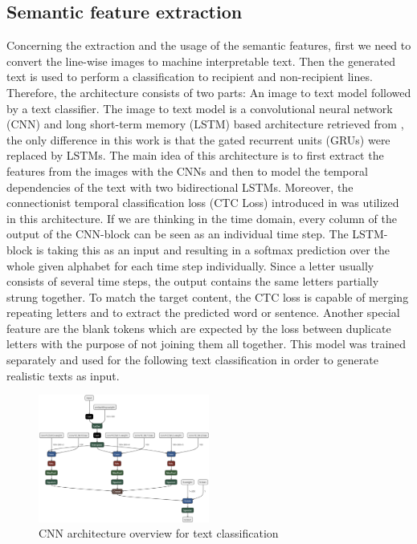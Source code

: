 \documentclass[conference]{IEEEtran}
\begin{document}
\subsection{Semantic feature extraction}\label{sem_feat}
Concerning the extraction and the usage of the semantic features, first we need to convert the line-wise images to machine interpretable text. Then the generated text is used to perform a classification to recipient and non-recipient lines. Therefore, the architecture consists of two parts: An image to text model followed by a text classifier. The image to text model is a convolutional neural network (CNN) and long short-term memory (LSTM) based architecture retrieved from \cite{8169670}, the only difference in this work is that the gated recurrent units (GRUs) were replaced by LSTMs. The main idea of this architecture is to first extract the features from the images with the CNNs and then to model the temporal dependencies of the text with two bidirectional LSTMs. Moreover, the connectionist temporal classification loss (CTC Loss) introduced in \cite{inproceedings} was utilized in this architecture. If we are thinking in the time domain, every column of the output of the CNN-block can be seen as an individual time step. The LSTM-block is taking this as an input and resulting in a softmax prediction over the whole given alphabet for each time step individually. Since a letter usually consists of several time steps, the output contains the same letters partially strung together. To match the target content, the CTC loss is capable of merging repeating letters and to extract the predicted word or sentence. Another special feature are the blank tokens which are expected by the loss between duplicate letters with the purpose of not joining them all together. This model was trained separately and used for the following text classification in order to generate realistic texts as input.
\begin{figure}[htbp]
    \centering
    \includegraphics[width=0.5\textwidth]{figures/lin_rec_cnn_model.png}
    \caption{CNN architecture overview for text classification}
    \label{cnn_arch}
\end{figure}
\end{document}
